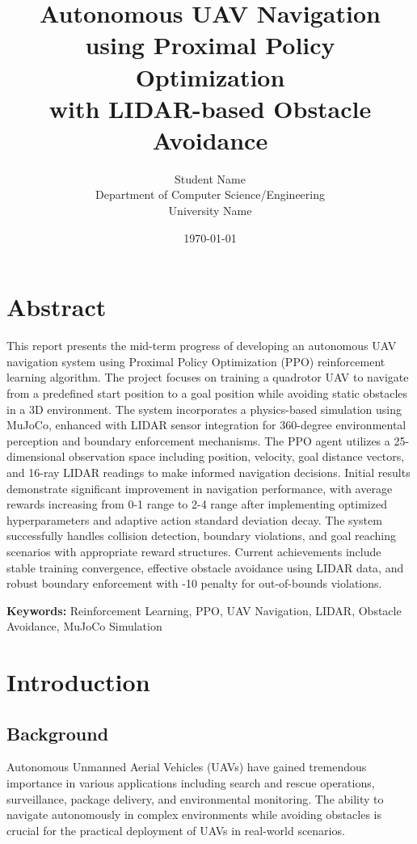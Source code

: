 \documentclass[12pt,a4paper]{article}
\title{\textbf{Autonomous UAV Navigation using Proximal Policy Optimization\\
with LIDAR-based Obstacle Avoidance}}
\author{Student Name\\
Department of Computer Science/Engineering\\
University Name}
\date{\today}
\begin{document}
\maketitle
\thispagestyle{empty}

\newpage

\section{Abstract}

This report presents the mid-term progress of developing an autonomous UAV navigation system using Proximal Policy Optimization (PPO) reinforcement learning algorithm. The project focuses on training a quadrotor UAV to navigate from a predefined start position to a goal position while avoiding static obstacles in a 3D environment. The system incorporates a physics-based simulation using MuJoCo, enhanced with LIDAR sensor integration for 360-degree environmental perception and boundary enforcement mechanisms. The PPO agent utilizes a 25-dimensional observation space including position, velocity, goal distance vectors, and 16-ray LIDAR readings to make informed navigation decisions. Initial results demonstrate significant improvement in navigation performance, with average rewards increasing from 0-1 range to 2-4 range after implementing optimized hyperparameters and adaptive action standard deviation decay. The system successfully handles collision detection, boundary violations, and goal reaching scenarios with appropriate reward structures. Current achievements include stable training convergence, effective obstacle avoidance using LIDAR data, and robust boundary enforcement with -10 penalty for out-of-bounds violations.

\textbf{Keywords:} Reinforcement Learning, PPO, UAV Navigation, LIDAR, Obstacle Avoidance, MuJoCo Simulation

\newpage

\tableofcontents
\newpage

\section{Introduction}

\subsection{Background}
Autonomous Unmanned Aerial Vehicles (UAVs) have gained tremendous importance in various applications including search and rescue operations, surveillance, package delivery, and environmental monitoring. The ability to navigate autonomously in complex environments while avoiding obstacles is crucial for the practical deployment of UAVs in real-world scenarios.
\end{document}
